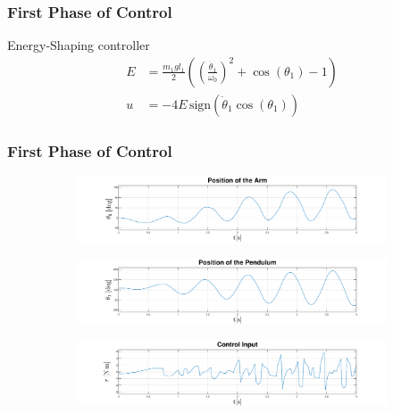 \documentclass[]{beamer}
\newcommand{\lrp}[1]{\ensuremath{\left( #1 \right)}}
\begin{document}
\begin{frame}
	\frametitle{First Phase of Control}
	Energy-Shaping controller
	\begin{subequations}\begin{align*}
			E &= \frac{m_1gl_1}{2}\lrp{\lrp{\frac{\dot{\theta}_1}{\omega_0}}^2+\cos(\theta_1) - 1}\\
			u &= -4E\,\text{sign}\lrp{\dot{\theta}_1\cos(\theta_1)}
		\end{align*}
	\end{subequations}
\end{frame}
\begin{frame}
	\frametitle{First Phase of Control}
	\begin{figure}[H]
		\centering
		\begin{subfigure}
			\centering
			\includegraphics[scale=0.25]{images/swings/arm.pdf}  
		\end{subfigure}
		\begin{subfigure}
			\centering
			\includegraphics[scale=0.25]{images/swings/pend.pdf}  
		\end{subfigure}
		\begin{subfigure}
			\centering
			\includegraphics[scale=0.25]{images/swings/control.pdf} 
		\end{subfigure}
	\end{figure}
\end{frame}
\end{document}
